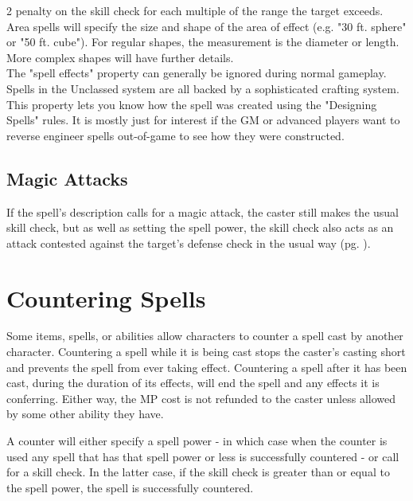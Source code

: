 \begin{multicols*}{2}
{    penalty on the skill check for each multiple of the range the
    target exceeds.} \\
    {Area spells will specify the size and shape of the area of
    effect (e.g. "30 ft. sphere" or "50 ft. cube"). For regular
    shapes, the measurement is the diameter or length. More complex
    shapes will have further details.} \\
    {The "spell effects" property can generally be ignored during
    normal gameplay. Spells in the Unclassed system are all backed
    by a sophisticated crafting system. This property lets you know
    how the spell was created using the "Designing Spells" rules.
    It is mostly just for interest if the GM or advanced players
    want to reverse engineer spells out-of-game to see how they
    were constructed.}

    \subsection{Magic Attacks}
    If the spell's description calls for a magic attack, the caster
    still makes the usual skill check, but as well as setting the spell
    power, the skill check also acts as an attack contested against
    the target's defense check in the usual way (pg.
    \pageref{combat:attacking}). %

    \section{Countering Spells}
    Some items, spells, or abilities allow characters to counter a
    spell cast by another character. Countering a spell while it is
    being cast stops the caster's casting short and prevents the spell
    from ever taking effect. Countering a spell after it has been cast,
    during the duration of its effects, will end the spell and any
    effects it is conferring. Either way, the MP cost is not refunded
    to the caster unless allowed by some other ability they have.

    A counter will either specify a spell power - in which case when
    the counter is used any spell that has that spell power or less is
    successfully countered - or call for a skill check. In the latter
    case, if the skill check is greater than or equal to the spell
    power, the spell is successfully countered.


\end{multicols*}
